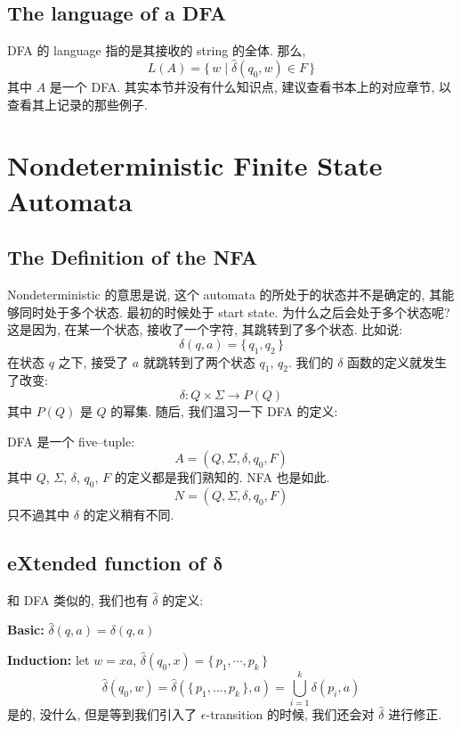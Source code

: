 \documentclass[../main_part1.tex]{subfiles}
\begin{document}
\subsection{The language of a DFA}

DFA 的 language 指的是其接收的 string 的全体. 那么, 
\[
	L (A) =  \{ \,  w \mid \hat\delta ( q_{0} , w ) \in F \, \}
\]
其中 \(A\) 是一个 DFA. 其实本节并没有什么知识点, 建议查看书本上的对应章节, 以查看其上记录的那些例子.

\section{Nondeterministic Finite State Automata}
\label{sec:Nondeterministic Finite State Automata}

\subsection{The Definition of the NFA}
Nondeterministic 的意思是说, 这个 automata 的所处于的状态并不是确定的, 其能够同时处于多个状态. 最初的时候处于 start state. 为什么之后会处于多个状态呢? 这是因为, 在某一个状态, 接收了一个字符, 其跳转到了多个状态. 比如说:
\[
	\delta (q , a ) = \{ \, q_{1}, q_{2} \, \}
\]
在状态 \(q\) 之下, 接受了 \(a\) 就跳转到了两个状态 \(q _{1}\), \(q _{2}\). 我们的 \(\delta \) 函数的定义就发生了改变: 
\[
	\delta: Q \times \Sigma \to P (Q)
\]
其中 \(P (Q)\) 是 \(Q\) 的幂集.
随后, 我们温习一下 DFA 的定义: 
\begin{definition}[DFA]
	DFA 是一个 five--tuple: 
	\[
	A = ( Q, \Sigma ,\delta , q _{0}, F)
	\]
	其中 \(Q\), \( \Sigma\), \(\delta\), \(q _{0}\), \(F\) 的定义都是我们熟知的. NFA 也是如此. 
	\[
	N = (Q , \Sigma ,\delta , q _{0} , F) 
	\]
	只不過其中 \(\delta\) 的定义稍有不同.
\end{definition}

\subsection{eXtended function of \(\boldsymbol{\delta}\)}
和 DFA 类似的, 我们也有 \(\hat\delta\) 的定义:

\medskip
{
	\setlength{\parindent}{40pt}\setlength{\hangindent}{40pt}%
	\textbf{Basic:} \(\hat\delta ( q, a ) =\delta (q ,a )\)

	\smallskip
	\setlength{\parindent}{40pt}\setlength{\hangindent}{40pt}%
	\textbf{Induction:} let \(w = xa\), \(\hat\delta (q _{0}, x) = \{ \,  p _{1}, \cdots , p _{k} \, \}\)%
	\[
	\hat\delta (q _{0} , w ) = \hat\delta ( \{ \, p _{1} , \dots , p _{k} \, \} , a ) = \bigcup_{i = 1} ^{k}\delta ( p_{i} , a)
	\]%
是的, 没什么, 但是等到我们引入了 \(\epsilon\)-transition 的时候, 我们还会对 \(\hat \delta\) 进行修正.
}
\medskip
\end{document}
